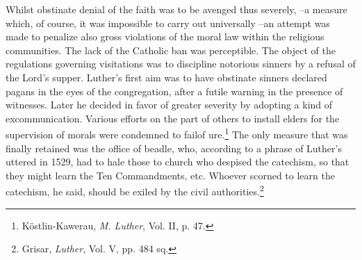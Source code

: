 Whilst obstinate denial of the faith was to be avenged thus severely,
--a measure which, of course, it was impossible to carry out universally
--an attempt was made to penalize also gross violations of the
moral law within the religious communities. The lack of the Catholic
ban was perceptible. The object of the regulations governing visitations
was to discipline notorious sinners by a refusal of the Lord’s supper.
Luther’s first aim was to have obstinate sinners declared pagans
in the eyes of the congregation, after a futile warning in the presence of
witnesses. Later he decided in favor of greater severity by adopting
a kind of excommunication. Various efforts on the part of others to
install elders for the supervision of morals were condemned to failof
ure.\footnote{Köstlin-Kawerau, \textit{M. Luther}, Vol. II, p. 47.}
 The only measure that was finally retained was the office of
beadle, who, according to a phrase of Luther’s uttered in 1529, had
to hale those to church who despised the catechism, so that they might
learn the Ten Commandments, etc. Whoever scorned to learn the catechism,
he said, should be exiled by the civil authorities.\footnote{Grisar, \textit{Luther}, Vol. V, pp. 484 sq.}
